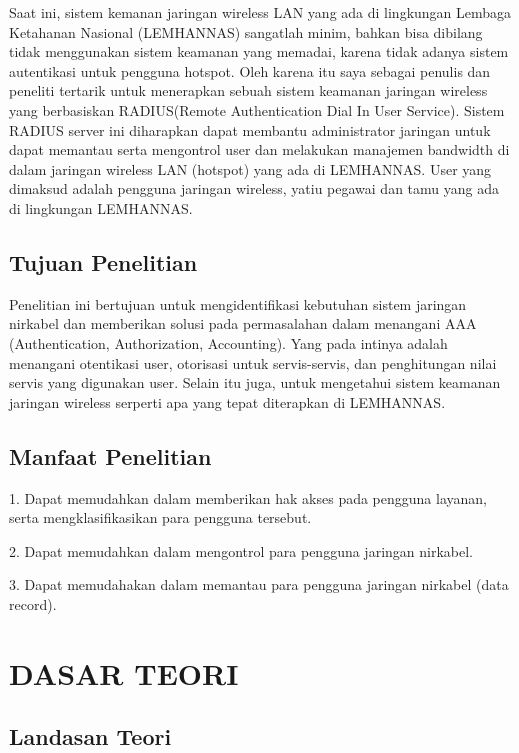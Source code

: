 \documentclass{jtetiproposalskripsi}
\begin{document}
Saat ini, sistem kemanan jaringan wireless LAN yang ada di lingkungan Lembaga Ketahanan Nasional (LEMHANNAS) sangatlah minim, bahkan bisa dibilang tidak menggunakan sistem keamanan yang memadai, karena tidak adanya sistem autentikasi untuk pengguna hotspot. Oleh karena itu saya sebagai penulis dan peneliti tertarik untuk menerapkan sebuah sistem keamanan
jaringan wireless yang berbasiskan RADIUS(Remote Authentication Dial In User Service). Sistem RADIUS server ini diharapkan dapat membantu administrator jaringan untuk dapat memantau serta 
mengontrol user dan melakukan manajemen bandwidth di dalam jaringan wireless LAN (hotspot) yang ada di LEMHANNAS. User yang dimaksud adalah pengguna jaringan wireless, yatiu pegawai dan tamu yang ada di lingkungan LEMHANNAS.



\section{Tujuan Penelitian}
Penelitian ini bertujuan untuk mengidentifikasi kebutuhan sistem
jaringan nirkabel dan memberikan solusi pada permasalahan dalam
menangani AAA (Authentication, Authorization, Accounting). Yang pada intinya adalah menangani otentikasi user, otorisasi untuk servis-servis, dan penghitungan nilai servis yang digunakan user. Selain itu juga, untuk mengetahui sistem keamanan jaringan wireless serperti apa yang tepat diterapkan di LEMHANNAS.


\section{Manfaat Penelitian}

1. Dapat memudahkan dalam memberikan hak akses pada pengguna
   layanan, serta mengklasifikasikan para pengguna tersebut.

2. Dapat memudahkan dalam mengontrol para pengguna jaringan
   nirkabel.

3. Dapat memudahakan dalam memantau para pengguna jaringan
   nirkabel (data record).



\chapter{DASAR TEORI}                

\section{Landasan Teori}
\end{document}
